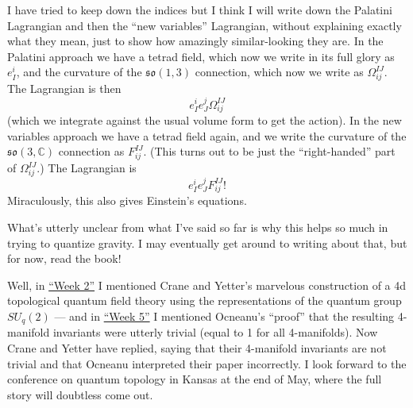 \documentclass{article}
\def\tightlist{}
\renewcommand{\texttt}[1]{%
  \begingroup
  \ttfamily
  \begingroup\lccode`~=`/\lowercase{\endgroup\def~}{/\discretionary{}{}{}}%
  \begingroup\lccode`~=`[\lowercase{\endgroup\def~}{[\discretionary{}{}{}}%
  \begingroup\lccode`~=`.\lowercase{\endgroup\def~}{.\discretionary{}{}{}}%
  \catcode`/=\active\catcode`[=\active\catcode`.=\active
  \scantokens{#1\noexpand}%
  \endgroup
}
\begin{document}
I have tried to keep down the indices but I think I will write down the
Palatini Lagrangian and then the ``new variables'' Lagrangian, without
explaining exactly what they mean, just to show how amazingly
similar-looking they are. In the Palatini approach we have a tetrad
field, which now we write in its full glory as \(e_I^i\), and the
curvature of the \(\mathfrak{so}(1,3)\) connection, which now we write
as \(\Omega_{ij}^{IJ}\). The Lagrangian is then
\[e_I^i e_J^j \Omega_{ij}^{IJ}\] (which we integrate against the usual
volume form to get the action). In the new variables approach we have a
tetrad field again, and we write the curvature of the
\(\mathfrak{so}(3,\mathbb{C})\) connection as \(F_{ij}^{IJ}\). (This
turns out to be just the ``right-handed'' part of \(\Omega_{ij}^{IJ}\).)
The Lagrangian is \[e_I^i e_J^j F_{ij}^{IJ} !\] Miraculously, this also
gives Einstein's equations.

What's utterly unclear from what I've said so far is why this helps so
much in trying to quantize gravity. I may eventually get around to
writing about that, but for now, read the book!


Well, in \protect\hyperlink{week2}{``Week 2''} I mentioned Crane and
Yetter's marvelous construction of a 4d topological quantum field theory
using the representations of the quantum group \(SU_q(2)\) --- and in
\protect\hyperlink{week5}{``Week 5''} I mentioned Ocneanu's ``proof''
that the resulting 4-manifold invariants were utterly trivial (equal to
1 for all 4-manifolds). Now Crane and Yetter have replied, saying that
their 4-manifold invariants are not trivial and that Ocneanu interpreted
their paper incorrectly. I look forward to the conference on quantum
topology in Kansas at the end of May, where the full story will
doubtless come out.

\end{document}
